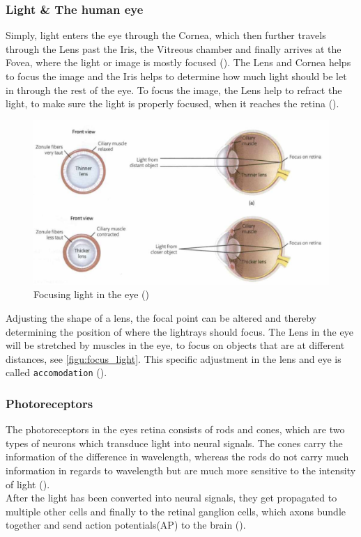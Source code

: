 \documentclass{article}
\newcommand{\goodcite}[1]{ {(\cite{#1})}}
\begin{document}
\subsubsection{Light \& The human eye}
Simply, light enters the eye through the Cornea, which then further travels through the Lens past the Iris, the Vitreous chamber and finally arrives at the Fovea, where the light or image is mostly focused\goodcite{hsp}. The Lens and Cornea helps to focus the image and the Iris helps to determine how much light should be let in through the rest of the eye. To focus the image, the Lens help to refract the light, to make sure the light is properly focused, when it reaches the retina\goodcite{hsp}.\medskip \\

\begin{figure}[H]
    \centering
    \includegraphics[width=\textwidth]{img/eyelens.png}
    \caption{Focusing light in the eye\goodcite{hsp}}
    \label{fig:focus_light}
\end{figure}

Adjusting the shape of a lens, the focal point can be altered and thereby determining the position of where the lightrays should focus. The Lens in the eye will be stretched by muscles in the eye, to focus on objects that are at different distances, see \autoref{figu:focus_light}. This specific adjustment in the lens and eye is called \texttt{accomodation}\goodcite{hsp}.

\subsubsection{Photoreceptors}
The photoreceptors in the eyes retina consists of rods and cones, which are two types of neurons which transduce light into neural signals. The cones carry the information of the difference in wavelength, whereas the rods do not carry much information in regards to wavelength but are much more sensitive to the intensity of light\goodcite{hsp}.\\After the light has been converted into neural signals, they get propagated to multiple other cells and finally to the retinal ganglion cells, which axons bundle together and send action potentials(AP) to the brain\goodcite{hsp}.\\
\end{document}
